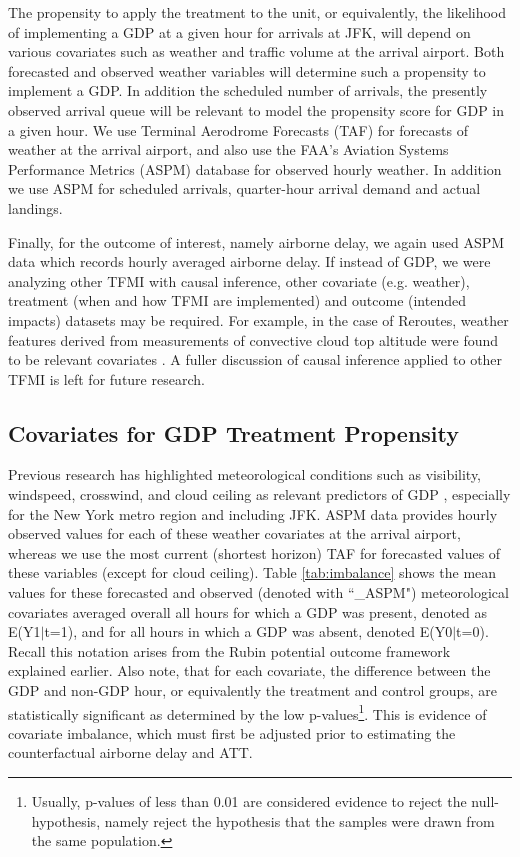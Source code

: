\documentclass[conference]{IEEEtran}
\begin{document}
The propensity to apply the treatment to the unit, or equivalently, the likelihood of implementing a GDP at a given hour for arrivals at JFK, will depend on various covariates such as weather and traffic volume at the arrival airport.  Both forecasted and observed weather variables will determine such a propensity to implement a GDP.  In addition the scheduled number of arrivals, the presently observed arrival queue will be relevant to model the propensity score for GDP in a given hour.  We use Terminal Aerodrome Forecasts (TAF) for forecasts of weather at the arrival airport, and also use the FAA's Aviation Systems Performance Metrics (ASPM) database for observed hourly weather.  In addition we use ASPM for scheduled arrivals, quarter-hour arrival demand and actual landings.  

Finally, for the outcome of interest, namely airborne delay, we again used ASPM data which records hourly averaged airborne delay.  If instead of GDP, we were analyzing other TFMI with causal inference, other covariate (e.g. weather), treatment (when and how TFMI are implemented) and outcome (intended impacts) datasets may be required.  For example, in the case of Reroutes, weather features derived from measurements of convective cloud top altitude were found to be relevant covariates \cite{arneson2015initial}.  A fuller discussion of causal inference applied to other TFMI is left for future research.


\subsection{Covariates for GDP Treatment Propensity}
Previous research has highlighted meteorological conditions such as visibility, windspeed, crosswind, and cloud ceiling as relevant predictors of GDP \cite{Grabbe:2014aa}, especially for the New York metro region and including JFK.  ASPM data provides hourly observed values for each of these weather covariates at the arrival airport, whereas we use the most current (shortest horizon) TAF for forecasted values of these variables (except for cloud ceiling).  Table \ref{tab:imbalance} shows the mean values for these forecasted and observed (denoted with ``\_ASPM") meteorological covariates averaged overall all hours for which a GDP was present, denoted as E(Y1$|$t=1), and for all hours in which a GDP was absent, denoted E(Y0$|$t=0).  Recall this notation arises from the Rubin potential outcome framework explained earlier.  Also note, that for each covariate, the difference between the GDP and non-GDP hour, or equivalently the treatment and control groups, are statistically significant as determined by the low p-values\footnote{Usually, p-values of less than 0.01 are considered evidence to reject the null-hypothesis, namely reject the hypothesis that the samples were drawn from the same population.}.  This is evidence of covariate imbalance, which must first be adjusted prior to estimating the counterfactual airborne delay and ATT.
\end{document}

